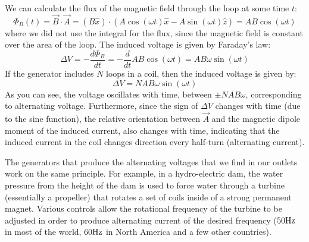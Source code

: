 We can calculate the flux of the magnetic field through the loop at some time $t$:
\begin{equation}
\Phi_B(t) =  \vec B \cdot \vec A = (B\hat x) \cdot (A\cos(\omega t) \hat x -A\sin(\omega t)\hat z)=AB\cos(\omega t)
\end{equation}
where we did not use the integral for the flux, since the magnetic field is constant over the area of the loop. The induced voltage is given by Faraday's law:
\begin{equation}
\Delta V = - \frac{d\Phi_B}{dt}  =  - \frac{d}{dt}AB\cos(\omega t) =  AB\omega\sin(\omega t)
\end{equation}
If the generator includes $N$ loops in a coil, then the induced voltage is given by:
\begin{equation}
\Delta V = NAB\omega\sin(\omega t)
\end{equation}
As you can see, the voltage oscillates with time, between $\pm NAB\omega$, corresponding to alternating voltage. Furthermore, since the sign of $\Delta V$ changes with time (due to the sine function), the relative orientation between $\vec A$ and the magnetic dipole moment of the induced current, also changes with time, indicating that the induced current in the coil changes direction every half-turn (alternating current).

The generators that produce the alternating voltages that we find in our outlets work on the same principle. For example, in a hydro-electric dam, the water pressure from the height of the dam is used to force water through a turbine (essentially a propeller) that rotates a set of coils inside of a strong permanent magnet. Various controls allow the rotational frequency of the turbine to be adjusted in order to produce alternating current of the desired frequency ($50 {\rm Hz}$ in most of the world, $60 {\rm Hz}$ in North America and a few other countries).

